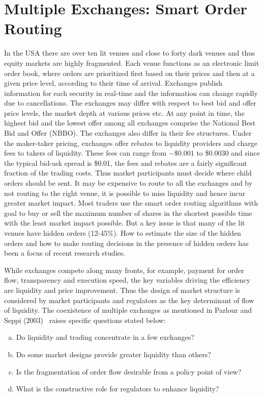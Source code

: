 \section{Multiple Exchanges:  Smart Order Routing}


In the USA there are over ten lit venues and close to forty dark venues and thus equity markets are highly fragmented. Each venue functions as an electronic limit order book, where orders are prioritized first based on their prices and then at a given price level, according to their time of arrival. Exchanges publish information for each security in real-time and the information can change rapidly due to cancellations. The exchanges may differ with respect to best bid and offer price levels, the market depth at various prices etc. At any point in time, the highest bid and the lowest offer among all exchanges comprise the National Best Bid and Offer (NBBO). The exchanges also differ in their fee structures. Under the maker-taker pricing, exchanges offer rebates to liquidity providers and charge fees to takers of liquidity. These fees can range from $-\$0.001$ to \$0.0030 and since the typical bid-ask spread is \$0.01, the fees and rebates are a fairly significant fraction of the trading costs. Thus market participants must decide where child orders should be sent. It may be expensive to route to all the exchanges and by not routing to the right venue, it is possible to miss liquidity and hence incur greater market impact. Most traders use the smart order routing algorithms with goal to buy or sell the maximum number of shares in the shortest possible time with the least market impact possible. But a key issue is that many of the lit venues have hidden orders (12-45\%). How to estimate the size of the hidden orders and how to make routing decisions in the presence of hidden orders has been a focus of recent research studies.


While exchanges compete along many fronts, for example, payment for order flow, transparency and execution speed, the key variables driving the efficiency are liquidity and price improvement. Thus the design of market structure is considered by market participants and regulators as the key determinant of flow of liquidity. The coexistence of multiple exchanges as mentioned in Parlour and Seppi (2003)~\cite{parlour2003} raises specific questions stated below:

\begin{enumerate}[a)]
\item Do liquidity and trading concentrate in a few exchanges?
\item Do some market designs provide greater liquidity than others?
\item Is the fragmentation of order flow desirable from a policy point of view?
\item What is the constructive role for regulators to enhance liquidity?
\end{enumerate}


